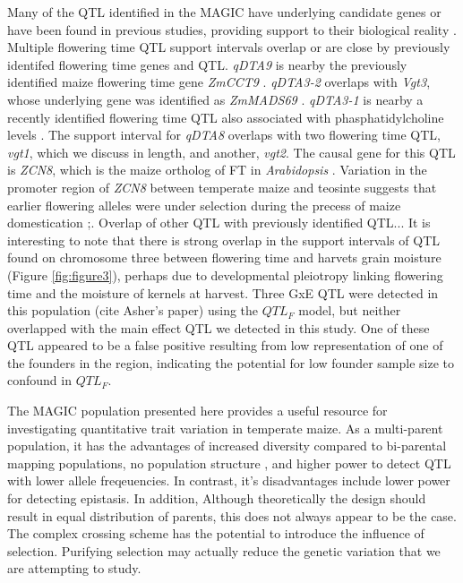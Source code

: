 \documentclass[article,9pt,twocolumn,twoside]{rilabRxiv}
\begin{document}
Many of the QTL identified in the MAGIC have underlying candidate genes or have been found in previous studies, providing support to their biological reality .
Multiple flowering time QTL support intervals overlap or are close by previously identifed flowering time genes and QTL.
\emph{qDTA9} is nearby the previously identified maize flowering time gene \emph{ZmCCT9} \cite{Huang3}.
\emph{qDTA3-2} overlaps with \emph{Vgt3}, whose underlying gene was identified as \emph{ZmMADS69} \cite{Liang}.
\emph{qDTA3-1} is nearby a recently identified flowering time QTL also associated with phasphatidylcholine levels \cite{RodriguezZapata}.
The support interval for \emph{qDTA8} overlaps with two flowering time QTL, \emph{vgt1}, which we discuss in length, and another, \emph{vgt2}. The causal gene for this QTL is \emph{ZCN8}, which is the maize ortholog of FT in \emph{Arabidopsis} \cite{Lazakis}.
Variation in the promoter region of \emph{ZCN8} between temperate maize and teosinte suggests that earlier flowering alleles were under selection during the precess of maize domestication \citep{Guo};\citep{Bouchet}.
Overlap of other QTL with previously identified QTL...
It is interesting to note that there is strong overlap in the support intervals of QTL found on chromosome three between flowering time and harvets grain moisture (Figure \ref{fig:figure3}), perhaps due to developmental pleiotropy linking flowering time and the moisture of kernels at harvest.
Three GxE QTL were detected in this population (cite Asher's paper) using the $QTL_F$ model, but neither overlapped with the main effect QTL we detected in this study.
One of these QTL appeared to be a false positive resulting from low representation of one of the founders in the region, indicating the potential for low founder sample size to confound in $QTL_F$.

The MAGIC population presented here provides a useful resource for investigating quantitative trait variation in temperate maize.
As a multi-parent population, it has the advantages of increased diversity compared to bi-parental mapping populations, no population structure , and higher power to detect QTL with lower allele freqeuencies.
In contrast, it's disadvantages include lower power for detecting epistasis. In addition, Although theoretically the design should result in equal distribution of parents, this does not always appear to be the case.
The complex crossing scheme has the potential to introduce the influence of selection.
Purifying selection may actually reduce the genetic variation that we are attempting to study.
\end{document}
